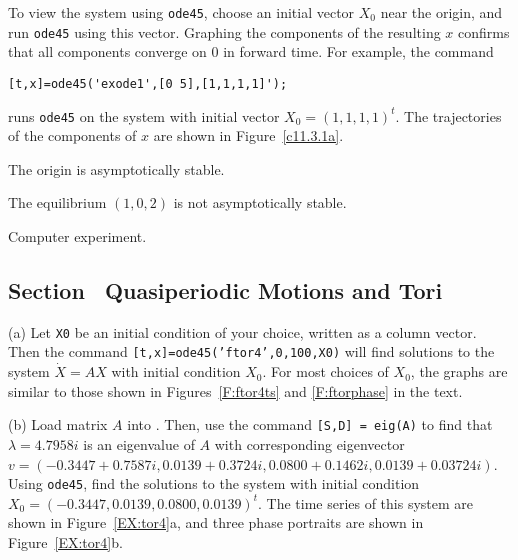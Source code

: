 \documentclass{ximera}
\begin{document}
\para To view the system using {\tt ode45}, choose an initial vector $X_0$
near the origin, and run {\tt ode45} using this vector.  Graphing the
components of the resulting $x$ confirms that all components converge on $0$
in forward time.  For example, the command
\begin{verbatim}
[t,x]=ode45('exode1',[0 5],[1,1,1,1]');
\end{verbatim}
runs {\tt ode45} on the system with initial vector $X_0 = (1,1,1,1)^t$.
The trajectories of the components of $x$ are shown in Figure~\ref{c11.3.1a}.

\begin{figure}[htb]
                       \centerline{%
                       }
\end{figure}

  The origin is asymptotically stable. 

  The equilibrium $(1,0,2)$ is not asymptotically stable. 

  Computer experiment.



\subsection*{Section~\protect{\ref{S:NLD}} Quasiperiodic Motions and Tori}

(a) Let {\tt X0} be an initial condition of your choice, written as a
column vector.  Then the command {\tt [t,x]=ode45('ftor4',0,100,X0)}
will find solutions to the system $\dot{X} = AX$ with initial condition
$X_0$.  For most choices of $X_0$, the graphs are similar to those shown
in Figures~\ref{F:ftor4ts} and \ref{F:ftorphase} in the text.

(b) Load matrix $A$ into \Matlabp.  Then, use the command
{\tt [S,D] = eig(A)} to find that $\lambda = 4.7958i$ is an eigenvalue of
$A$ with corresponding eigenvector $v = (-0.3447 + 0.7587i, 0.0139 +
0.3724i, 0.0800 + 0.1462i, 0.0139 + 0.03724i)$.  Using {\tt ode45}, find
the solutions to the system with initial condition $X_0 = (-0.3447, 0.0139,
0.0800, 0.0139)^t$.  The time series of this system are shown in
Figure~\ref{EX:tor4}a, and three phase portraits are shown in
Figure~\ref{EX:tor4}b.

\begin{figure}[htb]
                       \centerline{%
			\hspace{1.0in}
                       }
\end{figure}
\end{document}
